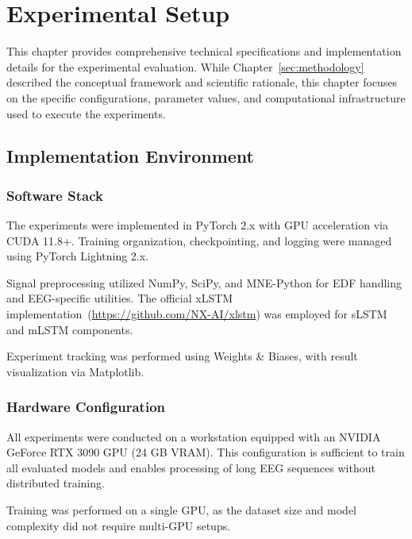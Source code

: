 \cleardoubleoddpage%
\chapter{Experimental Setup}
\label{sec:setup}

This chapter provides comprehensive technical specifications and implementation details for the experimental evaluation. While Chapter~\ref{sec:methodology} described the conceptual framework and scientific rationale, this chapter focuses on the specific configurations, parameter values, and computational infrastructure used to execute the experiments.

\section{Implementation Environment}
\label{sec:implementation_environment}

\subsection{Software Stack}
\label{sec:software_stack}

The experiments were implemented in PyTorch 2.x with GPU acceleration via CUDA 11.8+. Training organization, checkpointing, and logging were managed using PyTorch Lightning 2.x.

Signal preprocessing utilized NumPy, SciPy, and MNE-Python for \ac{EDF} handling and \ac{EEG}-specific utilities. The official xLSTM implementation~(\url{https://github.com/NX-AI/xlstm}) was employed for \ac{sLSTM} and \ac{mLSTM} components.

Experiment tracking was performed using Weights \& Biases, with result visualization via Matplotlib.

\subsection{Hardware Configuration}
\label{sec:hardware_config}

All experiments were conducted on a workstation equipped with an NVIDIA GeForce RTX 3090 GPU (24 GB VRAM). This configuration is sufficient to train all evaluated models and enables processing of long \ac{EEG} sequences without distributed training.

Training was performed on a single GPU, as the dataset size and model complexity did not require multi-GPU setups.

